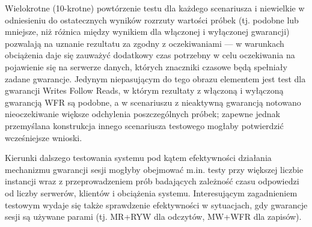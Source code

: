 Wielokrotne (10-krotne) powtórzenie testu dla każdego scenariusza i niewielkie w odniesieniu do ostatecznych wyników rozrzuty wartości próbek (tj. podobne lub mniejsze, niż różnica między wynikiem dla włączonej i wyłączonej gwarancji) pozwalają na uznanie rezultatu za zgodny z oczekiwaniami --- w warunkach obciążenia daje się zauważyć dodatkowy czas potrzebny w celu oczekiwania na pojawienie się na serwerze danych, których znaczniki czasowe będą spełniały zadane gwarancje. Jedynym niepasującym do tego obrazu elementem jest test dla gwarancji Writes Follow Reads, w którym rezultaty z włączoną i wyłączoną gwarancją WFR są podobne, a w scenariuszu z nieaktywną gwarancją notowano nieoczekiwanie większe odchylenia poszczególnych próbek; zapewne jednak przemyślana konstrukcja innego scenariusza testowego mogłaby potwierdzić wcześniejsze wnioski.

Kierunki dalszego testowania systemu pod kątem efektywności działania mechanizmu gwarancji sesji mogłyby obejmować m.in. testy przy większej liczbie instancji wraz z przeprowadzeniem prób badających zależność czasu odpowiedzi od liczby serwerów, klientów i obciążenia systemu. Interesującym zagadnieniem testowym wydaje się także sprawdzenie efektywności w sytuacjach, gdy gwarancje sesji są używane parami (tj. MR+RYW dla odczytów, MW+WFR dla zapisów).